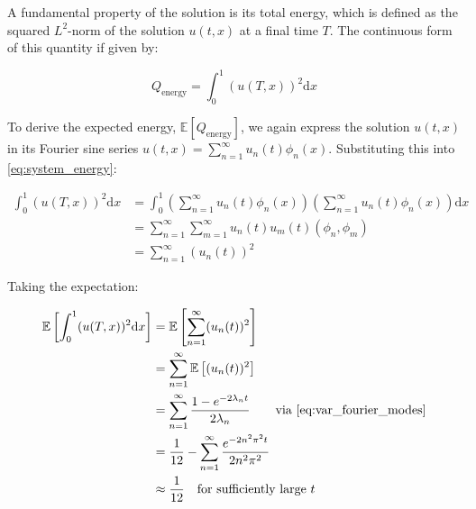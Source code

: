 A fundamental property of the solution is its total energy, which is defined 
as the squared $L^2$-norm of the solution $u(t,x)$ at a final time $T$. The 
continuous form of this quantity if given by:

\begin{equation}\label{eq:system_energy}
    Q_{\text{energy}} = \int_0^1 (u(T,x))^2 \mathrm{d}x
\end{equation}

To derive the expected energy, $\mathbb{E}[Q_{\text{energy}}]$, 
we again express the solution 
$u(t,x)$ in its Fourier sine series
$u(t,x) = \sum_{n=1}^\infty u_n(t)\phi_n(x)$. Substituting this into 
\eqref{eq:system_energy}:

\begin{align*}
    \int_0^1 (u(T,x))^2 \mathrm{d}x &= 
    \int_0^1\left(\sum_{n=1}^\infty u_n(t)\phi_n(x)\right)
    \left(\sum_{n=1}^\infty u_n(t)\phi_n(x)\right) \mathrm{d}x \\
    &= \sum_{n=1}^\infty \sum_{m=1}^\infty u_n(t) u_m(t) (\phi_n, \phi_m) \\
    &= \sum_{n=1}^\infty (u_n(t))^2
\end{align*}

Taking the expectation:

\begin{align*}
    \mathbb{E}\left[\int_0^1 (u(T,x))^2 \mathrm{d}x\right] &= 
    \mathbb{E}\left[\sum_{n=1}^\infty (u_n(t))^2\right] \\
    &= \sum_{n=1}^\infty \mathbb{E}\left[(u_n(t))^2\right] \\
    &= \sum_{n=1}^\infty \frac{1-e^{-2\lambda_n t}}{2\lambda_n}
    \qquad \text{via } \eqref{eq:var_fourier_modes}\\
    &= \frac{1}{12} - \sum_{n=1}^\infty \frac{e^{-2n^2 \pi^2 t}}{2 n^2 \pi^2}\\
    &\approx \frac{1}{12} \quad \text{for sufficiently large } t
\end{align*}


